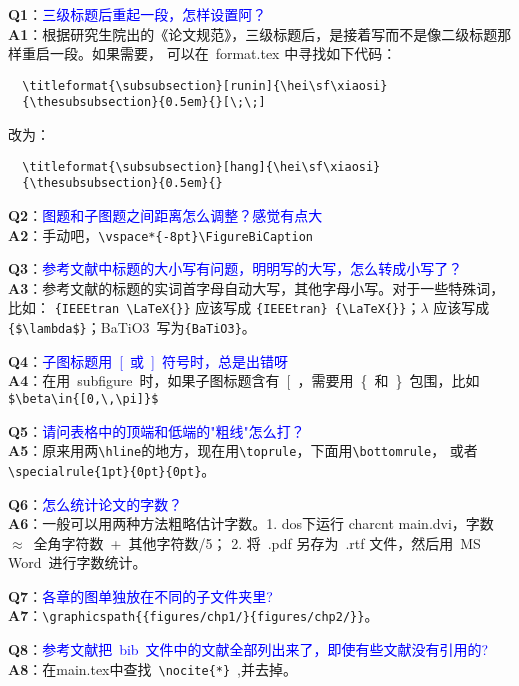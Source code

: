 \noindent \textbf{Q1}：\textcolor{blue}{三级标题后重起一段，怎样设置阿？}\\
\textbf{A1}：根据研究生院出的《论文规范》，三级标题后，是接着写而不是像二级标题那样重启一段。如果需要，
可以在~format.tex 中寻找如下代码：
\begin{verbatim}
  \titleformat{\subsubsection}[runin]{\hei\sf\xiaosi}
  {\thesubsubsection}{0.5em}{}[\;\;]
\end{verbatim}
改为：
\begin{verbatim}
  \titleformat{\subsubsection}[hang]{\hei\sf\xiaosi}
  {\thesubsubsection}{0.5em}{}
\end{verbatim}

\noindent \textbf{Q2}：\textcolor{blue}{图题和子图题之间距离怎么调整？感觉有点大}\\
\textbf{A2}：手动吧，\verb+\vspace*{-8pt}\FigureBiCaption+

\noindent \textbf{Q3}：\textcolor{blue}{参考文献中标题的大小写有问题，明明写的大写，怎么转成小写了？}\\
\textbf{A3}：参考文献的标题的实词首字母自动大写，其他字母小写。对于一些特殊词，比如：
\verb+{IEEEtran \LaTeX{}}+ 应该写成 \verb+{IEEEtran} {\LaTeX{}}+；$\lambda$ 应该写成
\verb+{$\lambda$}+；BaTiO3~写为\verb+{BaTiO3}+。

\noindent \textbf{Q4}：\textcolor{blue}{子图标题用~[~或~]~符号时，总是出错呀}\\
\textbf{A4}：在用~subfigure~时，如果子图标题含有~[~，需要用~\{~和~\}~包围，比如
\verb+$\beta\in{[0,\,\pi]}$+

\noindent \textbf{Q5}：\textcolor{blue}{请问表格中的顶端和低端的"粗线"怎么打？}\\
\textbf{A5}：原来用两\verb+\hline+的地方，现在用\verb+\toprule+，下面用\verb+\bottomrule+，
或者\verb+\specialrule{1pt}{0pt}{0pt}+。

\noindent \textbf{Q6}：\textcolor{blue}{怎么统计论文的字数？}\\
\textbf{A6}：一般可以用两种方法粗略估计字数。1. dos下运行 charcnt main.dvi，字数~$\approx$~全角字符数~+~其他字符数/5；
2. 将~.pdf 另存为~.rtf 文件，然后用~MS Word~进行字数统计。

\noindent \textbf{Q7}：\textcolor{blue}{各章的图单独放在不同的子文件夹里?}\\
\textbf{A7}：\verb+\graphicspath{{figures/chp1/}{figures/chp2/}}+。

\noindent \textbf{Q8}：\textcolor{blue}{参考文献把~bib~文件中的文献全部列出来了，即使有些文献没有引用的?}\\
\textbf{A8}：在main.tex中查找~\verb+\nocite{*}+~,并去掉。